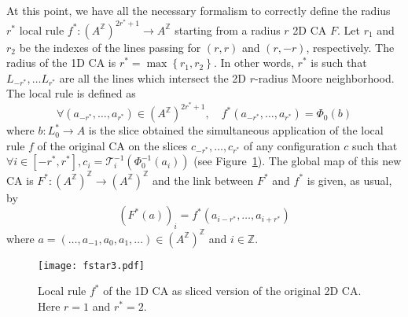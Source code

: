 \documentclass{llncs}
\newcommand{\z}{\ensuremath{\mathbb{Z}}\xspace}
\newcommand{\az}{\ensuremath{A^{\mathbb{Z}}}\xspace}
\newcommand{\set}[1]{\left\{#1\right\}}
\newcommand{\Tr}{\ensuremath{\mathcal{T}}}
\begin{document}
At this point, we have all the necessary formalism to correctly
define the radius $r^*$ local rule $f^*:(\az)^{2r^*+1}\to \az$
starting from a radius $r$ 2D CA $F$. Let $r_1$ and $r_2$ be the
indexes of the lines passing for $(r,r)$ and $(r,-r)$,
respectively. The radius of the 1D CA is $r^*=\max\set{r_1,r_2}$.
In other words, $r^*$ is such that $L_{-r^*},\ldots L_{r^*}$ are
all the lines which intersect the 2D $r$-radius Moore
neighborhood. The local rule is defined as
\[
\forall (a_{-r^*}, \ldots, a_{r^*})\in (\az)^{2r^*+1},\quad
 f^*(a_{-r^*}, \ldots , a_{r^*})= \Phi_0(b)
\]
where $b:L^*_0\to A$ is the slice obtained the simultaneous
application of the local rule $f$ of the original CA on the slices
$c_{-r^*},\ldots,c_{r^*}$ of any configuration $c$ such that
$\forall i\in[-r^*,r^*], c_i=\Tr^{-1}_i(\Phi^{-1}_0(a_i))$ (see
Figure~\ref{fig:slicing-f}). The global map of this new CA is
$F^*:(\az)^{\z}\to(\az)^{\z}$ and the link between $F^*$ and $f^*$
is given, as usual, by
\[
(F^*(a))_i=f^*(a_{i-r^*}, \ldots, a_{i+r^*})
\]
where $a=(\ldots, a_{-1}, a_0, a_1, \ldots)\in(\az)^{\z}$ and
$i\in\z$.
\begin{figure}[!htb]
  \begin{center}
     \texttt{[image: fstar3.pdf]}
   \end{center}
   \caption{Local rule $f^*$ of the 1D CA as sliced version of the original 2D CA.
   Here $r=1$ and $r^*=2$.}
   \label{fig:slicing-f}
\end{figure}
\smallskip
\end{document}

